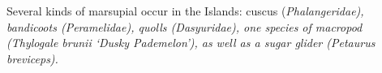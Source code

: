 Several kinds of marsupial occur in the  Islands: cuscus (\it{Phalangeridae}),
bandicoots (\it{Peramelidae}), quolls (\it{Dasyuridae}),
one species of macropod (\it{Thylogale brunii} ‘Dusky Pademelon’),
as well as a sugar glider (\it{Petaurus breviceps}).